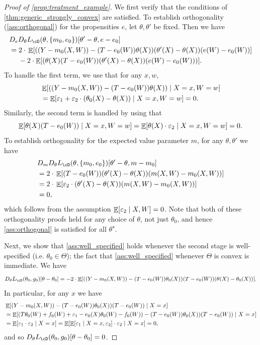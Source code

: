 \documentclass[11pt]{article} %
\newcommand{\pref}[1]{\cref{#1}}
\newcommand{\pfref}[1]{Proof of \pref{#1}}
\theoremstyle{theorem}  %
\theoremstyle{plain}
\DeclarePairedDelimiter{\brk}{[}{]}
\DeclarePairedDelimiter{\crl}{\{}{\}}
\DeclarePairedDelimiter{\prn}{(}{)}
\DeclareMathOperator{\En}{\mathbb{E}}
\newcommand{\veps}{\varepsilon}
\newcommand{\poprisk}{L_{\cD}}
\newcommand{\target}{\Theta}
\newcommand{\besttwo}{\theta^{\star}}
\newcommand{\gtone}{g_0}
\newcommand{\gttwo}{\theta_0}
\begin{document}
\begin{proof}[\pfref{prop:treatment_example}]
  We first verify that the conditions of
  \pref{thm:generic_strongly_convex} are
  satisfied.
  To establish orthogonality (\pref{ass:orthogonal}) for the propensities $e$, let $\theta,\theta'$ be fixed. Then we have
\begin{align*}
&D_{e}D_{\theta}\poprisk(\theta,\crl*{m_0,e_0})[\theta'-\theta,e-e_{0}] \\ 
&= 2\cdot{}\En\brk*{
\prn*{(Y-m_{0}(X,W)) - (T-e_{0}(W))\theta(X)}(\theta'(X)-\theta(X))(e(W)-e_{0}(W))
}\\
&~~~~-2\cdot\En\brk*{
\prn*{\theta(X)(T-e_{0}(W))(\theta'(X)-\theta(X))(e(W)-e_{0}(W))
}
}.
\end{align*}
To handle the first term, we use that for any $x,w$,
\begin{align*}
&\En\brk*{\prn*{(Y-m_{0}(X,W)) - (T-e_{0}(W))\theta(X)}\mid{}X=x,W=w}\\
&= \En\brk*{\veps_{1} + \veps_{2}\cdot(\theta_{0}(X)-\theta(X))\mid{}X=x,W=w}=0.
\end{align*}
Similarly, the second term is handled by using that
\[
\En\brk*{\theta(X)(T-e_0(W))\mid{}X=x,W=w} = \En\brk*{\theta(X)\cdot\veps_2\mid{}X=x,W=w}=0.
\]
To establish orthogonality for the expected value parameter $m$, for any $\theta,\theta'$ we have
\begin{align*}
&D_{m}D_{\theta}\poprisk(\theta,\crl*{m_0,e_0})[\theta'-\theta,m-m_{0}] \\ 
&= 2\cdot{}\En\brk*{
(T-e_{0}(W))(\theta'(X)-\theta(X))(m(X,W)-m_{0}(X,W))
} \\
&= 2\cdot{}\En\brk*{
\veps_2\cdot{}(\theta'(X)-\theta(X))(m(X,W)-m_{0}(X,W))
}\\
&=0,
\end{align*}
which follows from the assumption $\En\brk*{\veps_2\mid{}X,W}=0$. Note
that both of these orthogonality proofs held for any choice of
$\theta$, not just $\theta_0$, and hence \pref{ass:orthogonal} is
satisfied for all $\besttwo$.

Next, we show that \pref{ass:well_specified} holds whenever the second
stage is well-specified (i.e. $\gttwo\in\target$); the fact that
\pref{ass:well_specified} whenever $\target$ is convex is immediate. We have
\begin{align*}
D_{\theta}\poprisk(\gttwo,\gtone)[\theta-\theta_{0}] = -2\cdot\En\brk*{
\prn*{(Y-m_{0}(X,W)) - (T-e_{0}(W))\theta_{0}(X)}(T-e_{0}(W))(\theta(X)-\theta_{0}(X))
}.
\end{align*}
In particular, for any $x$ we have
\begin{align*}
&\En\brk*{(Y-m_{0}(X,W)) - (T-e_{0}(W))\theta_{0}(X))(T-e_{0}(W))\mid{}X=x} \\
&= \En\brk*{(T\theta_{0}(W)+f_{0}(W)+\veps_1-e_{0}(X)\theta_0(W)-f_{0}(W)) - (T-e_{0}(W))\theta_{0}(X))(T-e_{0}(W))\mid{}X=x} \\
&= \En\brk*{\veps_1\cdot{}\veps_2\mid{}X=x} = \En\brk*{\En\brk*{\veps_1\mid{}X=x,\veps_2}\cdot{}\veps_2\mid{}X=x}=0,
\end{align*}
and so $D_{\theta}\poprisk(\gttwo,\gtone)[\theta-\theta_{0}]=0$.


\end{proof}
\end{document}
